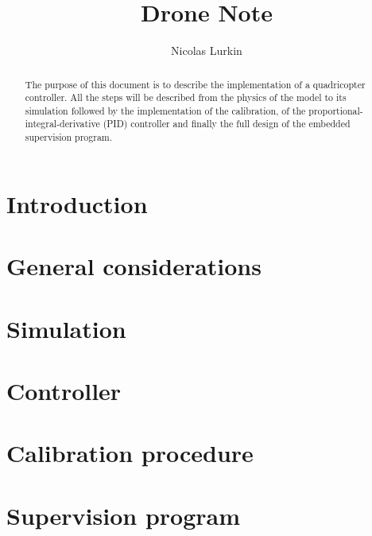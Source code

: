 \documentclass{article}
\title{Drone Note}
\author{Nicolas Lurkin}
\begin{document}
\maketitle

\begin{abstract}
The purpose of this document is to describe the implementation of a quadricopter
controller. All the steps will be described from the physics of the model to its
simulation followed by the implementation of the calibration, of the
proportional-integral-derivative (PID) controller and finally the full design of
the embedded supervision program.
\end{abstract}

\section{Introduction} 

\section{General considerations}


\section{Simulation}


\section{Controller}


\section{Calibration procedure}

\section{Supervision program}

\thebibliography{}
\end{document}
